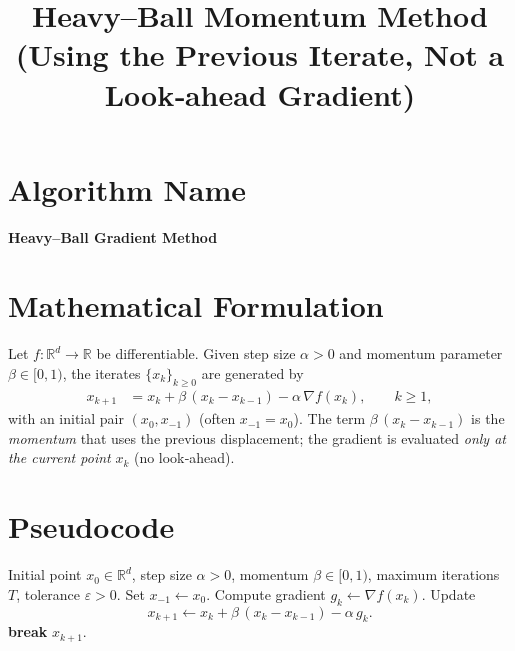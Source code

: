 \documentclass[12pt]{article}
\newcommand{\R}{\mathbb{R}}
\begin{document}
\title{Heavy–Ball Momentum Method\\
(Using the Previous Iterate, Not a Look‑ahead Gradient)}
\author{}
\date{}
\maketitle

\tableofcontents
\newpage

\section*{Algorithm Name}
\begin{center}
\textbf{Heavy–Ball Gradient Method}
\end{center}

\section*{Mathematical Formulation}
Let $f:\R^{d}\rightarrow\R$ be differentiable.  
Given step size $\alpha>0$ and momentum parameter $\beta\in[0,1)$, the iterates
$\{x_k\}_{k\ge 0}$ are generated by
\begin{align}
x_{k+1}&=x_k+\beta\,(x_k-x_{k-1})-\alpha\,\nabla f(x_k),\qquad k\ge 1,
\label{eq:update}
\end{align}
with an initial pair $(x_0,x_{-1})$ (often $x_{-1}=x_0$).  
The term $\beta\,(x_k-x_{k-1})$ is the \emph{momentum} that uses the previous displacement; the gradient is evaluated \emph{only at the current point} $x_k$ (no look‑ahead).

\section*{Pseudocode}
\begin{algorithm}[H]
\caption{Heavy–Ball Gradient Method}
\begin{algorithmic}[1]
\REQUIRE Initial point $x_0\in\R^{d}$, step size $\alpha>0$, momentum $\beta\in[0,1)$,
        maximum iterations $T$, tolerance $\varepsilon>0$.
\STATE Set $x_{-1}\leftarrow x_0$.
    \STATE Compute gradient $g_k\leftarrow \nabla f(x_k)$.
    \STATE Update
    \[
    x_{k+1}\leftarrow x_k+\beta\,(x_k-x_{k-1})-\alpha\,g_k .
    \]
        \STATE \textbf{break}
    \ENDIF
\ENDFOR
\RETURN $x_{k+1}$.
\end{algorithmic}
\end{algorithm}
\end{document}

